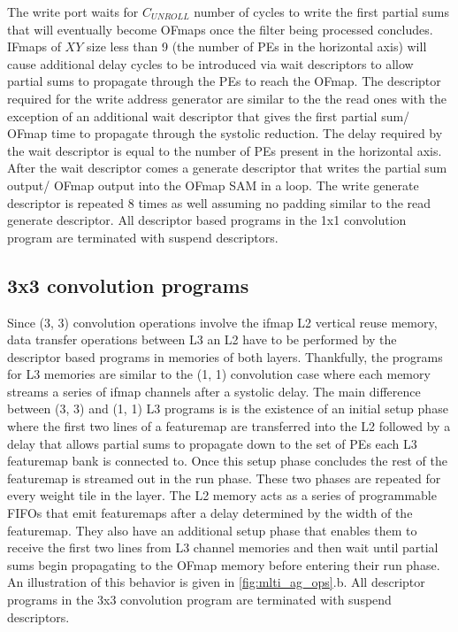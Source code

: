 The write port waits for $C_{UNROLL}$ number of cycles to write the first
partial sums that will eventually become OFmaps once the filter being processed
concludes. IFmaps of $XY$ size less than 9 (the number of PEs in the horizontal
axis) will cause additional delay cycles to be introduced via wait descriptors
to allow partial sums to propagate through the PEs to reach the OFmap.
 The descriptor required for
the write address generator are similar to the the read ones with the exception
of an additional wait descriptor that gives the first partial sum/ OFmap time to
propagate through the systolic reduction. The delay required by the wait
descriptor is equal to the number of PEs present in the horizontal axis. After
the wait descriptor comes a generate descriptor that writes the partial sum
output/ OFmap output into the OFmap SAM in a loop. The write generate
descriptor is repeated 8 times as well assuming no padding similar to
the read generate descriptor. All descriptor based programs in the 1x1
convolution program are terminated with suspend descriptors. 

\subsection{3x3 convolution programs}
\label{chap:sams:acc_scheduling:3x3}

Since (3, 3) convolution operations involve the ifmap L2 vertical reuse memory,
data transfer operations between L3 an L2 have to be performed by the descriptor
based programs in memories of both layers. Thankfully, the programs for L3
memories are similar to the (1, 1) convolution case where each memory streams a
series of ifmap channels after a systolic delay. The main difference between (3,
3) and (1, 1) L3 programs is is the existence of an initial setup phase where
the first two lines of a featuremap are transferred into the L2 followed by a
delay that allows partial sums to propagate down to the set of PEs each L3
featuremap bank is connected to. Once this setup phase concludes the rest of the
featuremap is streamed out in the run phase. These two phases are repeated for
every weight tile in the layer. The L2 memory acts as a series of programmable
FIFOs that emit featuremaps after a delay determined by the width of the
featuremap. They also have an additional setup phase that enables them to
receive the first two lines from L3 channel memories and then wait until partial
sums begin propagating to the OFmap memory before entering their run phase. An
illustration of this behavior is given in \autoref{fig:mlti_ag_ops}.b. All
descriptor programs in the 3x3 convolution program are terminated with suspend
descriptors. 


